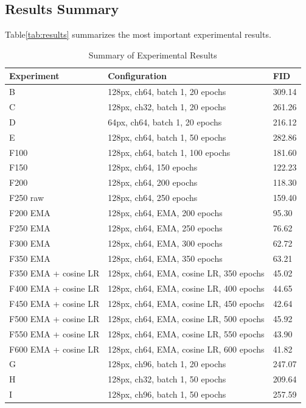\documentclass[conference]{IEEEtran}
\begin{document}
\subsection{Results Summary}
Table\ref{tab:results} summarizes the most important experimental results.

\begin{table}[t]
\centering
\caption{Summary of Experimental Results}
\small
\begin{tabular}{lll}
\hline
\textbf{Experiment} & \textbf{Configuration} & \textbf{FID} \\
\hline
B & 128px, ch64, batch 1, 20 epochs & 309.14 \\
C & 128px, ch32, batch 1, 20 epochs & 261.26 \\
D & 64px, ch64, batch 1, 20 epochs & 216.12 \\
E & 128px, ch64, batch 1, 50 epochs & 282.86 \\
F100 & 128px, ch64, batch 1, 100 epochs & 181.60 \\
F150 & 128px, ch64, 150 epochs & 122.23 \\
F200 & 128px, ch64, 200 epochs & 118.30 \\
F250 raw & 128px, ch64, 250 epochs & 159.40 \\
F200 EMA & 128px, ch64, EMA, 200 epochs & 95.30 \\
F250 EMA & 128px, ch64, EMA, 250 epochs & 76.62 \\
F300 EMA & 128px, ch64, EMA, 300 epochs & 62.72 \\
F350 EMA & 128px, ch64, EMA, 350 epochs & 63.21 \\
F350 EMA + cosine LR & 128px, ch64, EMA, cosine LR, 350 epochs & 45.02 \\
F400 EMA + cosine LR & 128px, ch64, EMA, cosine LR, 400 epochs & 44.65 \\
F450 EMA + cosine LR & 128px, ch64, EMA, cosine LR, 450 epochs & 42.64 \\
F500 EMA + cosine LR & 128px, ch64, EMA, cosine LR, 500 epochs & 45.92 \\
F550 EMA + cosine LR & 128px, ch64, EMA, cosine LR, 550 epochs & 43.90 \\
F600 EMA + cosine LR & 128px, ch64, EMA, cosine LR, 600 epochs & 41.82 \\
G & 128px, ch96, batch 1, 20 epochs & 247.07 \\
H & 128px, ch32, batch 1, 50 epochs & 209.64 \\
I & 128px, ch96, batch 1, 50 epochs & 257.59 \\

\end{tabular}
\end{table}
\end{document}

